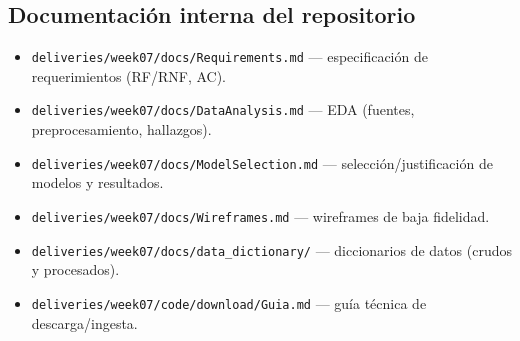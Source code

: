 \documentclass[11pt]{article}
\begin{document}
\subsection{Documentación interna del repositorio}
\begin{itemize}
  \item \texttt{deliveries/week07/docs/Requirements.md} --- especificación de requerimientos (RF/RNF, AC).
  \item \texttt{deliveries/week07/docs/DataAnalysis.md} --- EDA (fuentes, preprocesamiento, hallazgos).
  \item \texttt{deliveries/week07/docs/ModelSelection.md} --- selección/justificación de modelos y resultados.
  \item \texttt{deliveries/week07/docs/Wireframes.md} --- wireframes de baja fidelidad.
  \item \texttt{deliveries/week07/docs/data\_dictionary/} --- diccionarios de datos (crudos y procesados).
  \item \texttt{deliveries/week07/code/download/Guia.md} --- guía técnica de descarga/ingesta.
\end{itemize}
\end{document}
